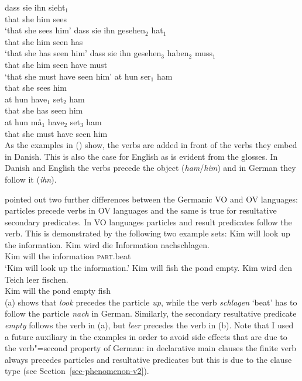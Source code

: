 \eal
\ex
\gll dass sie ihn sieht$_1$\\
     that she him sees\\
\glt `that she sees him'
\ex
\gll dass sie ihn gesehen$_2$ hat$_1$\\
     that she him seen        has\\
\glt `that she has seen him'
\ex
\gll dass sie ihn gesehen$_3$ haben$_2$ muss$_1$\\
     that she him seen        have     must\\
\glt `that she must have seen him'
\zl
\eal
\ex
\gll at   hun ser$_1$ ham\\
     that she  sees    him\\
\ex
\gll at   hun have$_1$ set$_2$ ham\\
     that she  has      seen    him\\
\ex
\gll at   hun må$_1$ have$_2$ set$_3$ ham\\
     that she  must   have     seen   him\\
\zl
%
As the examples in () show, the verbs are added in front of the verbs they embed in
Danish. This is also the case for English as is evident from the glosses. In Danish and English the
verbs precede the object (\emph{ham}/\emph{him}) and in German they follow it (\emph{ihn}). 

\citet[Section~15.2]{Haider2020a} pointed out two further differences between the Germanic VO and OV languages:
particles precede verbs in OV languages and the same is true for resultative secondary
predicates. In VO languages particles and result predicates follow the verb. This is demonstrated by
the following two example sets:
\eal
\ex Kim will look up the information.
\ex 
\gll Kim wird die Information nachschlagen.\\
     Kim will the information \textsc{part}.beat\\
\glt `Kim will look up the information.'
\zl
\eal
\ex Kim will fish the pond empty.
\ex 
\gll Kim wird den Teich leer fischen.\\
     Kim will the pond  empty fish\\
\zl
(a) shows that \emph{look} precedes the particle \emph{up}, while the verb \emph{schlagen}
`beat' has to follow the particle \emph{nach} in German. Similarly, the secondary resultative
predicate \emph{empty} follows the verb in (a), but \emph{leer} precedes the verb in
(b). Note that I used a future auxiliary in the examples in order to avoid side effects that
are due to the verb"=second property of German: in declarative main clauses the finite verb always
precedes particles and resultative predicates but this is due to the clause type (see Section~\ref{sec-phenomenon-v2}).

